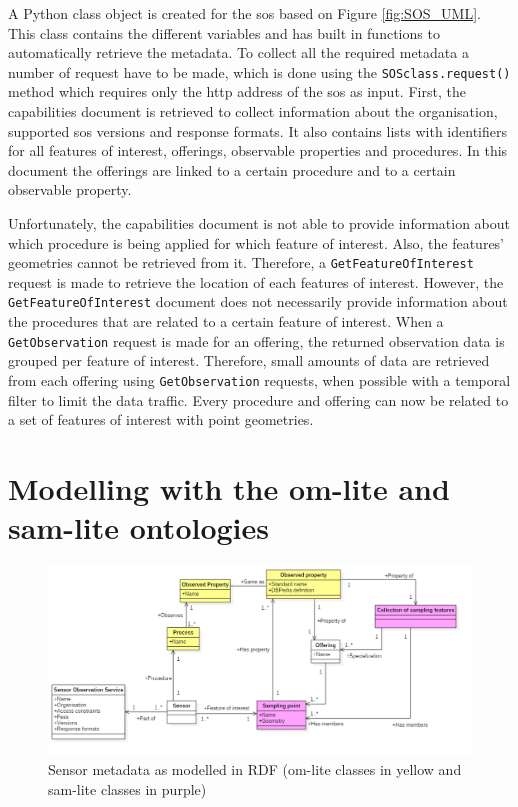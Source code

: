 A Python class object is created for the \ac{sos} based on Figure \ref{fig:SOS_UML}. This class contains the different variables and has built in functions to automatically retrieve the metadata. To collect all the required metadata a number of request have to be made, which is done using the \texttt{SOSclass.request()} method which requires only the \ac{http} address of the \ac{sos} as input. First, the capabilities document is retrieved to collect information about the organisation, supported \ac{sos} versions and response formats. It also contains lists with identifiers for all features of interest, offerings, observable properties and procedures. In this document the offerings are linked to a certain procedure and to a certain observable property. 

Unfortunately, the capabilities document is not able to provide information about which procedure is being applied for which feature of interest. Also, the features' geometries cannot be retrieved from it. Therefore, a \texttt{GetFeatureOfInterest} request is made to retrieve the location of each features of interest. However, the \texttt{GetFeatureOfInterest} document does not necessarily provide information about the procedures that are related to a certain feature of interest. When a \texttt{GetObservation} request is made for an offering, the returned observation data is grouped per feature of interest. 
Therefore, small amounts of data are retrieved from each offering using \texttt{GetObservation} requests, when possible with a temporal filter to limit the data traffic. 
Every procedure and offering can now be related to a set of features of interest with point geometries.  
 

\section{Modelling with the om-lite and sam-lite ontologies}
\begin{figure}
	\centering
	\includegraphics[width=1\linewidth]{UML/SOS_Semantic_UML.PNG}
	\caption{Sensor metadata as modelled in RDF (om-lite classes in yellow and sam-lite classes in purple)}
	\label{fig:SOS_Semantic_UML}
\end{figure}

